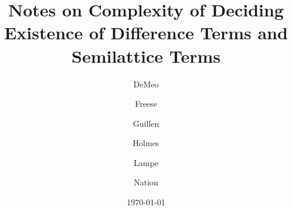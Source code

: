 
\newcommand\draftbreak{\ifthenelse{\boolean{draftpagebreak}}{\newpage}{}}



\newcommand\draftsecskip{\ifthenelse{\boolean{draftsecskip}}{\medskip}{}}





\theoremstyle{plain}
\newtheorem{thm}{Theorem}[section]
\newtheorem{lem}[thm]{Lemma}
\newtheorem{prop}[thm]{Proposition}
\theoremstyle{definition}
\newtheorem{claim}[thm]{Claim}
\newtheorem{cor}[thm]{Corollary}
\newtheorem{definition}[thm]{Definition}
\newtheorem{notation}[thm]{Notation}
\newtheorem{fact}[thm]{Fact}
\newtheorem{question}{Question}
\newtheorem{prob}{Problem}
\newtheorem{example}[thm]{Example}
\newtheorem{examples}[thm]{Examples}
\newtheorem{exercise}{Exercise}
\newtheorem*{rem}{Remark}
\newtheorem*{rems}{Remarks}



\usepackage{inputs/proof-dashed}



\usepackage{inputs/macros}

\usepackage{fullpage}


\title[Difference Terms and Semilattice Terms]{%
  Notes on Complexity of Deciding Existence of Difference Terms and Semilattice Terms}
\date{\today}
\author{DeMeo}
\address{University of Hawaii}
\author{Freese}
\author{Guillen}
\author{Holmes}
\author{Lampe}
\author{Nation}



\maketitle

